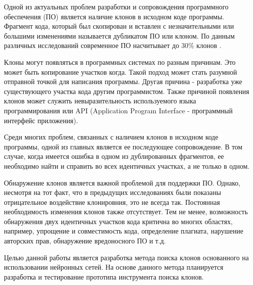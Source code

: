 \intro
Одной из актуальных проблем разработки и сопровождения программного обеспечения (ПО) является наличие клонов в исходном коде программы. Фрагмент кода, который был скопирован и вставлен с незначительными или большими изменениями называется дубликатом ПО или клоном. По данным различных исследований современное ПО насчитывает до 30\% клонов \cite{royandcordy}.

Клоны могут появляться в программных системах по разным причинам. Это может быть копирование участков когда. Такой подход может стать разумной отправной точкой для написания программы. Другая причина - разработка уже существующего участка кода другим программистом. Также причиной появления клонов может служить невыразительность используемого языка программирования или API (Application Program Interface - программный интерфейс приложения).


Среди многих проблем, связанных с наличием клонов в исходном коде программы, одной из главных является ее последующее сопровождение. В том случае, когда имеется ошибка в одном из дублированных фрагментов, ее необходимо найти и справить во всех идентичных участках, а не только в одном.

Обнаружение клонов является важной проблемой для поддержки ПО. Однако, несмотря на тот факт, что в предыдущих исследованиях были показаны отрицательное воздействие клонировния, это не всегда так. Постоянная необходимость изменения клонов также отсутствует. Тем не менее, возможность обнаружения двух идентичных участков кода критична во многих областях, например, упрощение и совместимость кода, определение плагиата, нарушение авторских прав, обнаружение вредоносного ПО и т.д.

Целью данной работы является разработка метода поиска клонов основанного на использовании нейронных сетей. На основе данного метода планируется разработка и тестирование прототипа инструмента поиска клонов.
